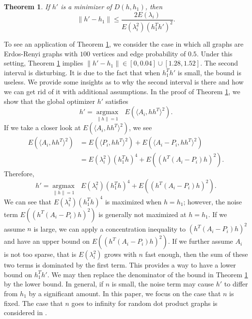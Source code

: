 \documentclass[10pt,journal,compsoc]{IEEEtran}
\newtheorem{theorem}{Theorem}[section]
\begin{document}
\begin{theorem}
\label{thm:2}
If $h'$ is a minimizer of $D(h,h_1)$, then 
\[\|h'-h_1\| \leq \frac{2 E(\lambda_i)}{E(\lambda_i^2)(h_1^T h')^2}. \]
\end{theorem}

\noindent	To see an application of Theorem \ref{thm:2}, we consider the case in which all graphs are Erdos-Renyi graphs with $100$ vertices and edge probability of $0.5$. Under this setting, Theorem \ref{thm:2} implies  $\|h'-h_1\| \in [0,0.04] \cup [1.28,1.52]$. The second interval is disturbing. It is due to the fact that when $h_1^T h'$ is small, the bound is useless. We provide some insights as to why the second interval is there and how we can get rid of it with additional assumptions. In the proof of Theorem \ref{thm:2}, we show that the global optimizer $h'$ satisfies
\[h'= \underset{\|h\| =1}{\operatorname{argmax}} \text{ } E(\langle A_i,h h^T \rangle ^2). \]
If we take a closer look at $E(\langle A_i,h h^T \rangle ^2)$, we see
\begin{align*}
	E(\langle A_i,h h^T \rangle ^2) &= E(\langle P_i,h h^T \rangle ^2)+E(\langle A_i-P_i,h h^T \rangle ^2) \\
	&=E(\lambda_i^2)(h_1^T h)^4+E((h^T (A_i-P_i)h) ^2).
\end{align*}
Therefore, 
\[h'= \underset{\|h\| =1}{\operatorname{argmax}} \text{ } E(\lambda_i^2)(h_1^T h)^4+E((h^T (A_i-P_i)h) ^2) .\]
We can see that $E(\lambda_i^2)(h_1^T h)^4$ is maximized when $h=h_1$; however, the noise term $E((h^T (A_i-P_i)h) ^2)$ is generally not maximized at $h=h_1$. If we assume $n$ is large, we can apply a concentration inequality to $(h^T (A_i-P_i)h) ^2$ and have an upper bound on $E((h^T (A_i-P_i)h) ^2)$. If we further assume $A_i$ is not too sparse, that is $E(\lambda_i^2)$ grows with $n$ fast enough, then the sum of these two terms is dominated by the first term. This provides a way to have a lower bound on $h_1^T h'$. We may then replace the denominator of the bound in Theorem \ref{thm:2} by the lower bound. In general, if $n$ is small, the noise term may cause $h'$ to differ from $h_1$ by a significant amount. In this paper, we focus on the case that $n$ is fixed. The case that $n$ goes to infinity for random dot product graphs is considered in \cite{athreya2013limit}.\\
\end{document}
